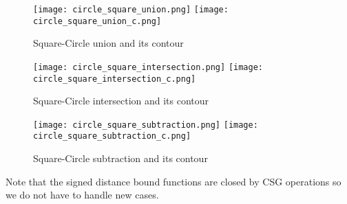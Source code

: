 \begin{figure}[!htb]
  \texttt{[image: circle\_square\_union.png]}
  \texttt{[image: circle\_square\_union\_c.png]}
  \caption{Square-Circle union and its contour}\label{fig:union}
\endminipage\hfill
{}
  \texttt{[image: circle\_square\_intersection.png]}
  \texttt{[image: circle\_square\_intersection\_c.png]}
  \caption{Square-Circle intersection and its contour}
  \label{fig:intersection}
\endminipage\hfill
{}%
  \texttt{[image: circle\_square\_subtraction.png]}
  \texttt{[image: circle\_square\_subtraction\_c.png]}
  \caption{Square-Circle subtraction and its contour}
  \label{fig:subtraction}
\endminipage
\end{figure}
Note that the signed distance bound functions are closed by CSG operations so we do not have to handle new cases.

